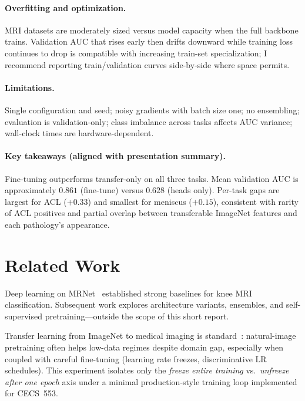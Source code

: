 \documentclass[10pt,twocolumn]{article}
\begin{document}
\paragraph{Overfitting and optimization.}
MRI datasets are moderately sized versus model capacity when the full backbone trains. Validation AUC that rises early then drifts downward while training loss continues to drop is compatible with increasing train-set specialization; I recommend reporting train/validation curves side-by-side where space permits.

\paragraph{Limitations.}
Single configuration and seed; noisy gradients with batch size one; no ensembling; evaluation is validation-only; class imbalance across tasks affects AUC variance; wall-clock times are hardware-dependent.

\paragraph{Key takeaways (aligned with presentation summary).}
Fine-tuning outperforms transfer-only on all three tasks. Mean validation AUC is approximately $0.861$ (fine-tune) versus $0.628$ (heads only). Per-task gaps are largest for ACL ($+0.33$) and smallest for meniscus ($+0.15$), consistent with rarity of ACL positives and partial overlap between transferable ImageNet features and each pathology's appearance.

\section{Related Work}
\label{sec:related}

Deep learning on MRNet~\cite{bien2020deep} established strong baselines for knee MRI classification. Subsequent work explores architecture variants, ensembles, and self-supervised pretraining---outside the scope of this short report.

Transfer learning from ImageNet to medical imaging is standard~\cite{deng2009imagenet, he2016deep}: natural-image pretraining often helps low-data regimes despite domain gap, especially when coupled with careful fine-tuning (learning rate freezes, discriminative LR schedules). This experiment isolates only the \textit{freeze entire training} vs.\ \textit{unfreeze after one epoch} axis under a minimal production-style training loop implemented for CECS~553.
\end{document}
